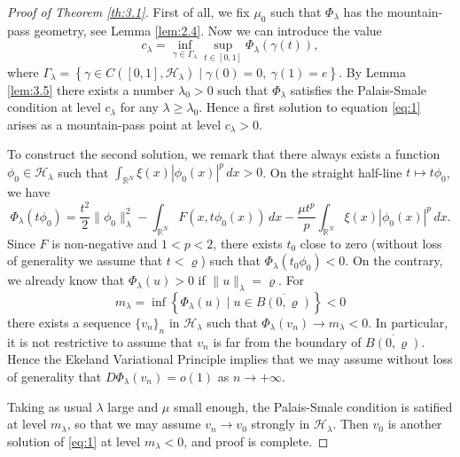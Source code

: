 \documentclass[11pt]{amsart}
\numberwithin{equation}{section}
\theoremstyle{remark}
\theoremstyle{definition}
\begin{document}
\begin{proof}[Proof of Theorem \ref{th:3.1}]
	First of all, we fix $\mu_0$ such that $\Phi_\lambda$ has the mountain-pass geometry, see Lemma \ref{lem:2.4}. Now we can introduce the value
	\[
	c_\lambda = \inf_{\gamma \in \Gamma_\lambda} \sup_{t \in [0,1]} \Phi_\lambda(\gamma(t)),
	\]
	where $\Gamma_\lambda = \left\{ \gamma \in C([0,1],\mathscr{H}_\lambda) \mid \gamma(0)=0, \ \gamma(1)=e \right\}$. By Lemma \ref{lem:3.5} there exists a number $\lambda_0>0$ such that $\Phi_\lambda$ satisfies the Palais-Smale condition at level $c_\lambda$ for any $\lambda \geqslant \lambda_0$. Hence a first solution to equation \eqref{eq:1} arises as a mountain-pass point at level $c_\lambda>0$.
	
	To construct the second solution, we remark that there always exists a function $\phi_0 \in \mathscr{H}_\lambda$ such that $\int_{\mathbb{R}^N} \xi(x) |\phi_0(x)|^p \, dx >0$. On the straight half-line $t \mapsto t \phi_0$, we have
	\[
	\Phi_\lambda(t \phi_0) = \frac{t^2}{2} \|\phi_0\|_\lambda^2 - \int_{\mathbb{R}^N} F(x,t\phi_0(x))\, dx - \frac{\mu t^p}{p} \int_{\mathbb{R}^N} \xi(x) |\phi_0(x)|^p \, dx.
	\]
	Since $F$ is non-negative and $1<p<2$, there exists $t_0$ close to zero (without loss of generality we assume that $t < \varrho$) such that $\Phi_\lambda(t_0 \phi_0)<0$. On the contrary, we already know that $\Phi_\lambda(u) >0$ if $\|u\|_\lambda = \varrho$. For
	\[
	m_\lambda = \inf \left\{ \Phi_\lambda (u) \mid u \in \overline{B(0,\varrho)}
	\right\}  <0
	\]
	there exists a sequence $\{v_n\}_n$ in $\mathscr{H}_\lambda$ such that $\Phi_\lambda(v_n) \to m_\lambda<0$. In particular, it is not restrictive to assume that $v_n$ is far from the boundary of $\overline{B(0,\varrho)}$. Hence the Ekeland Variational Principle implies that we may assume without loss of generality that $D\Phi_\lambda(v_n) =o(1)$ as $n \to +\infty$.
	
	Taking as usual $\lambda$ large and $\mu$ small enough, the Palais-Smale condition is satified at level $m_\lambda$, so that we may assume $v_n \to v_0$ strongly in $\mathscr{H}_\lambda$. Then $v_0$ is another solution of \eqref{eq:1} at level $m_\lambda<0$, and proof is complete.
\end{proof}
\end{document}
